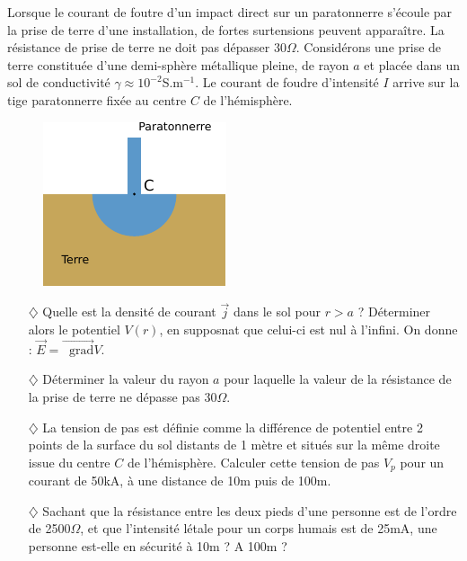 \documentclass{report}
\newcommand*\grad{\mathop{}\!\mathrm{grad}}
\begin{document}
Lorsque le courant de foutre d'un impact direct sur un paratonnerre s'écoule par la prise de terre d'une installation, de fortes surtensions peuvent apparaître. La résistance de prise de terre ne doit pas dépasser 30$\Omega$. Considérons une prise de terre constituée d'une demi-sphère métallique pleine, de rayon $a$ et placée dans un sol de conductivité $\gamma\approx10^{-2}$S.m$^{-1}$. Le courant de foudre d'intensité $I$ arrive sur la tige paratonnerre fixée au centre $C$ de l'hémisphère.

\begin{figure}[h!]
\centering
		\includegraphics[scale=1.5]{EM1.pdf}
\end{figure}

\begin{itemize}
	
	\item[$\diamondsuit$] Quelle est la densité de courant $\vec{j}$ dans le sol pour $r>a$ ? Déterminer alors le potentiel $V(r)$, en supposnat que celui-ci est nul à l'infini. On donne : $\vec{E}=\vec{\grad}V$.
	
	\item[$\diamondsuit$] Déterminer la valeur du rayon $a$ pour laquelle la valeur de la résistance de la prise de terre ne dépasse pas 30$\Omega$.
	
	\item[$\diamondsuit$] La tension de pas est définie comme la différence de potentiel entre 2 points de la surface du sol distants de 1 mètre et situés sur la même droite issue du centre $C$ de l'hémisphère. Calculer cette tension de pas $V_p$ pour un courant de 50kA, à une distance de 10m puis de 100m.
	
	\item[$\diamondsuit$] Sachant que la résistance entre les deux pieds d'une personne est de l'ordre de 2500$\Omega$, et que l'intensité létale pour un corps humais est de 25mA, une personne est-elle en sécurité à 10m ? A 100m ? 
	
\end{itemize} 
\end{document}
